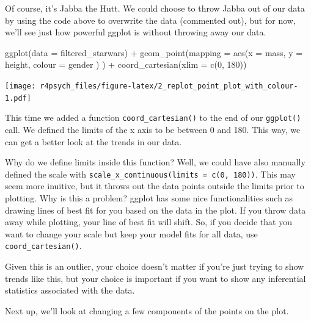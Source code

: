 \documentclass[
]{book}
\newenvironment{Shaded}{\begin{snugshade}}{\end{snugshade}}
\newcommand{\AttributeTok}[1]{\textcolor[rgb]{0.77,0.63,0.00}{#1}}
\newcommand{\DecValTok}[1]{\textcolor[rgb]{0.00,0.00,0.81}{#1}}
\newcommand{\FunctionTok}[1]{\textcolor[rgb]{0.00,0.00,0.00}{#1}}
\newcommand{\NormalTok}[1]{#1}
\newcommand{\SpecialCharTok}[1]{\textcolor[rgb]{0.00,0.00,0.00}{#1}}
\begin{document}
Of course, it's Jabba the Hutt. We could choose to throw Jabba out of our data by using the code above to overwrite the data (commented out), but for now, we'll see just how powerful ggplot is without throwing away our data.

\begin{Shaded}
\begin{Highlighting}[]
\FunctionTok{ggplot}\NormalTok{(}\AttributeTok{data =}\NormalTok{ filtered\_starwars) }\SpecialCharTok{+}
  \FunctionTok{geom\_point}\NormalTok{(}\AttributeTok{mapping =} \FunctionTok{aes}\NormalTok{(}\AttributeTok{x =}\NormalTok{ mass, }
                           \AttributeTok{y =}\NormalTok{ height, }
                           \AttributeTok{colour =}\NormalTok{ gender}
\NormalTok{                           )}
\NormalTok{             ) }\SpecialCharTok{+}
  \FunctionTok{coord\_cartesian}\NormalTok{(}\AttributeTok{xlim =} \FunctionTok{c}\NormalTok{(}\DecValTok{0}\NormalTok{, }\DecValTok{180}\NormalTok{))}
\end{Highlighting}
\end{Shaded}

\texttt{[image: r4psych\_files/figure-latex/2\_replot\_point\_plot\_with\_colour-1.pdf]}

This time we added a function \texttt{coord\_cartesian()} to the end of our \texttt{ggplot()} call. We defined the limits of the x axis to be between 0 and 180. This way, we can get a better look at the trends in our data.

Why do we define limits inside this function? Well, we could have also manually defined the scale with \texttt{scale\_x\_continuous(limits\ =\ c(0,\ 180))}. This may seem more inuitive, but it throws out the data points outside the limits prior to plotting. Why is this a problem? ggplot has some nice functionalities such as drawing lines of best fit for you based on the data in the plot. If you throw data away while plotting, your line of best fit will shift. So, if you decide that you want to change your scale but keep your model fits for all data, use \texttt{coord\_cartesian()}.

Given this is an outlier, your choice doesn't matter if you're just trying to show trends like this, but your choice is important if you want to show any inferential statistics associated with the data.

Next up, we'll look at changing a few components of the points on the plot.
\end{document}
